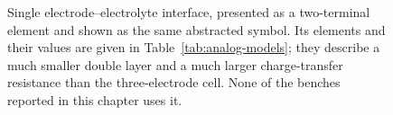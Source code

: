 \providecommand{\MaestroRoot}{include/analog/}

\begin{figure}[htbp]
  \centering
\begin{circuitikz}[
    every node/.append style={font=\footnotesize},
    nlab/.style={font=\scriptsize, inner sep=1.5pt},
  ]
\end{circuitikz}
  \caption[{Single-interface model.}]{Single electrode--electrolyte interface, presented as a two-terminal element and shown as the same abstracted symbol. Its elements and their values are given in Table~\ref{tab:analog-models}; they describe a much smaller double layer and a much larger charge-transfer resistance than the three-electrode cell. None of the benches reported in this chapter uses it.}
  \label{fig:randles-electrode}
\end{figure}
